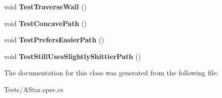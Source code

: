 \begin{DoxyCompactItemize}
void {\bfseries Test\+Traverse\+Wall} ()
\item 
\mbox{\label{class_stompy_blondie_1_1_tests_1_1_a_star_test_a0f205a6187501b6fa942d6360e19d291}} 
void {\bfseries Test\+Concave\+Path} ()
\item 
\mbox{\label{class_stompy_blondie_1_1_tests_1_1_a_star_test_a6ff587eb89aaa2ea6115d334b8a12ad6}} 
void {\bfseries Test\+Prefers\+Easier\+Path} ()
\item 
\mbox{\label{class_stompy_blondie_1_1_tests_1_1_a_star_test_afa53068f9da8d3664925753ed7cf3b4e}} 
void {\bfseries Test\+Still\+Uses\+Slightly\+Shittier\+Path} ()
\end{DoxyCompactItemize}


The documentation for this class was generated from the following file\+:\begin{DoxyCompactItemize}
\item 
Tests/A\+Star.\+spec.\+cs\end{DoxyCompactItemize}
